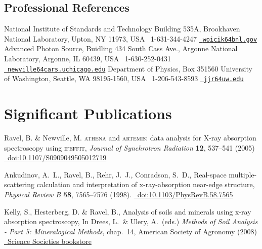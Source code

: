 \documentclass[11pt]{moderncv}
\begin{document}
\subsection{Professional References}
%
{National Institute of Standards and Technology\newline
  Building 535A, Brookhaven National Laboratory, Upton, NY 11973, USA\newline
  \phonesymbol\ 1-631-344-4247\quad
  \href{mailto:woicik@bnl.gov}{\emailsymbol\ \footnotesize\texttt{woicik\char64bnl.gov}}}
%
{Advanced Photon Source, Buidling 434 South Cass Ave., Argonne National Laboratory, Argonne, IL 60439, USA\newline
  \phonesymbol\ 1-630-252-0431\quad
  \href{mailto:newville@cars.uchicago.edu}
  {\emailsymbol\ \footnotesize\texttt{newville\char64cars.uchicago.edu}}}
%
{Department of Physics, Box 351560\newline
  University of Washington, Seattle, WA 98195-1560, USA\newline
  \phonesymbol\ 1-206-543-8593\quad
  \href{mailto:jjr@uw.edu}{\emailsymbol\ \footnotesize\texttt{jjr\char64uw.edu}}}

\section{Significant Publications}
\label{sec:highlights}

%
{\small Ravel, B. \& Newville, M. \textsc{athena} and
  \textsc{artemis}: data analysis for X-ray absorption spectroscopy
  using \textsc{ifeffit}, \emph{Journal of Synchrotron Radiation}
  \textbf{12}, 537--541 (2005)
  \href{http://dx.doi.org/10.1107/S0909049505012719}
  {\color{color2}\homepagesymbol~doi:10.1107/S0909049505012719}}

%
{\small Ankudinov, A.~L., Ravel, B., Rehr, J.~J., Conradson, S.~D.,
  Real-space multiple-scattering calculation and interpretation of
  x-ray-absorption near-edge structure, \emph{Physical Review B}
  \textbf{58}, 7565--7576 (1998).
  \href{http://dx.doi.org/10.1103/PhysRevB.58.7565}
  {\color{color2}\homepagesymbol~doi:10.1103/PhysRevB.58.7565}}

%
{\small Kelly, S., Hesterberg, D. \& Ravel, B., Analysis of soils and
  minerals using x-ray absorption spectroscopy, In Drees, L.\ \&
  Ulery, A.\ (eds.)  \emph{Methods of Soil Analysis - Part 5:
    Mineralogical Methods}, chap.~14, American Society of Agronomy
  (2008)
  \href{https://portal.sciencesocieties.org/Purchase/ProductDetail.aspx?Product_code=802f0511-76f0-dc11-b6b8-0013210e308c}
  {\color{color2}\homepagesymbol~Science Societies bookstore}}



\nocite{*}


\end{document}
